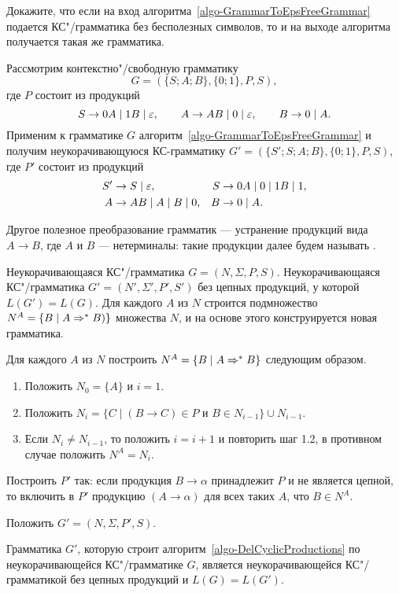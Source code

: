 \begin{myproblem}
\label{problem-GrammarToEpsFreeGrammarWOUselessSymbols}
Докажите, что если на вход алгоритма~\ref{algo-GrammarToEpsFreeGrammar} подается КС"/грамматика без бесполезных символов, то и на выходе алгоритма получается такая же грамматика.
\end{myproblem}

\begin{myexample}
Рассмотрим контекстно"/свободную грамматику
\[
    G=(\{S;A;B\},\{0;1\},P,S),
\]
где $P$ состоит из продукций
\[
	S \to 0A \mid 1B \mid \varepsilon, \qquad
    A \to AB \mid 0 \mid \varepsilon, \qquad
    B \to 0 \mid A.
\]
Применим к грамматике $G$ алгоритм~\ref{algo-GrammarToEpsFreeGrammar} и получим неукорачивающуюся КС-грамматику $G'=(\{S';S;A;B\},\{0;1\},P,S)$, где $P'$ состоит из продукций
\begin{align*}
    S' &\to S \mid \varepsilon, &
    S  &\to 0A \mid 0 \mid 1B \mid 1, \\
    A  &\to AB \mid A \mid B \mid 0, &
    B  &\to 0 \mid A.
\end{align*}
\end{myexample}

Другое полезное преобразование грамматик --- устранение продукций вида $A\to B$, где $A$ и $B$ --- нетерминалы: такие продукции далее будем называть .

{\label{algo-DelCyclicProductions}Неукорачивающаяся КС"/грамматика $G=(N,\Sigma,P,S)$.}
{Неукорачивающаяся КС"/грамматика $G'=(N',\Sigma',P',S')$ без цепных продукций, у которой $L(G')=L(G)$.}
{Для каждого $A$ из $N$ строится подмножество $N^A=\{B\mid A\Rightarrow^*B)\}$ множества $N$, и на основе этого конструируется новая грамматика.}
{
\item
Для каждого $A$ из $N$ построить $N^A=\{B\mid A\Rightarrow^*B\}$ следующим образом.
\begin{enumerate}[leftmargin=1cm]
\item Положить $N_0=\{A\}$ и $i=1$.

\item Положить $N_i=\{C\mid (B\to C)\in P$ и $B\in N_{i-1}\}\cup N_{i-1}$.

\item Если $N_i\neq N_{i-1}$, то положить $i=i+1$ и повторить шаг 1.2, в противном случае положить $N^A=N_i$.
\end{enumerate}

\item
Построить $P'$ так: если продукция $B\to\alpha$ принадлежит $P$ и не является цепной, то включить в $P'$ продукцию $(A\to\alpha)$ для всех таких $A$, что $B\in N^A$.

\item
Положить $G'=(N,\Sigma,P',S)$.
}
\begin{mytheorem}
\label{theorem-AlgoDelEpsProductionsCorrectnessWOEpsProducts}
Грамматика $G'$, которую строит алгоритм~\ref{algo-DelCyclicProductions} по неукорачивающейся КС"/грамматике $G$, является неукорачивающейся КС"/грамматикой без цепных продукций и $L(G)=L(G')$.
\end{mytheorem}

